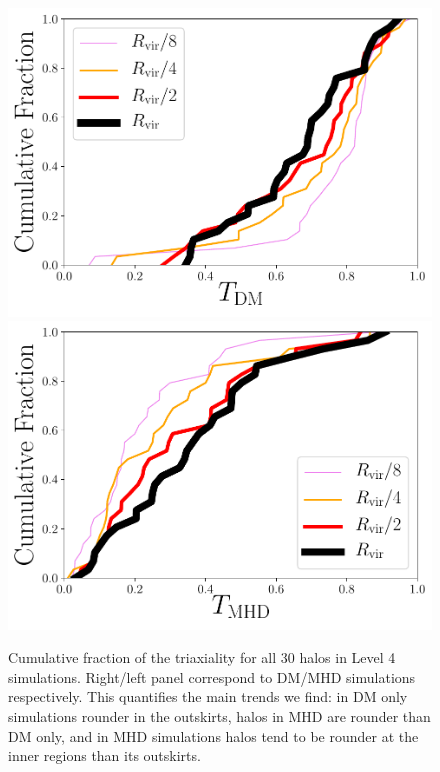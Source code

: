 \documentclass[a4paper,fleqn,usenatbib]{mnras}
\begin{document}
\begin{figure}
\includegraphics[width=0.9\columnwidth]{triaxialiy_distro_DM.pdf}
\includegraphics[width=0.9\columnwidth]{triaxialiy_distro_MHD.pdf}
\caption{Cumulative fraction of the triaxiality for all 30 halos in
  Level 4 simulations. Right/left panel correspond to DM/MHD
  simulations respectively. 
  This quantifies the main trends we find: in DM only simulations
  rounder in the outskirts, halos in MHD are rounder than DM only, and
  in MHD simulations halos tend to be rounder at the inner regions
  than its outskirts.}
\label{fig:triax_cumulative}
\end{figure}
\end{document}

